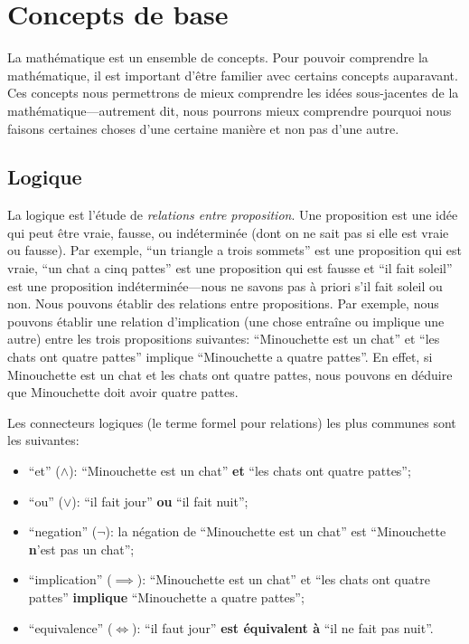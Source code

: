 \chapter{Concepts de base}

La mathématique est un ensemble de concepts. Pour pouvoir comprendre la mathématique, il est important d'être familier avec certains concepts auparavant. Ces concepts nous permettrons de mieux comprendre les idées sous-jacentes de la mathématique---autrement dit, nous pourrons mieux comprendre pourquoi nous faisons certaines choses d'une certaine manière et non pas d'une autre.

\section{Logique}

La logique est l'étude de {\em relations entre proposition}. Une proposition est une idée qui peut être vraie, fausse, ou indéterminée (dont on ne sait pas si elle est vraie ou fausse). Par exemple, ``un triangle a trois sommets'' est une proposition qui est vraie, ``un chat a cinq pattes'' est une proposition qui est fausse et ``il fait soleil'' est une proposition indéterminée---nous ne savons pas à priori s'il fait soleil ou non. Nous pouvons établir des relations entre propositions. Par exemple, nous pouvons établir une relation d'implication (une chose entraîne ou implique une autre) entre les trois propositions suivantes: ``Minouchette est un chat'' et ``les chats ont quatre pattes'' implique ``Minouchette a quatre pattes''. En effet, si Minouchette est un chat et les chats ont quatre pattes, nous pouvons en déduire que Minouchette doit avoir quatre pattes.

Les connecteurs logiques (le terme formel pour relations) les plus communes sont les suivantes:
\begin{itemize}
    \item ``et'' ($\wedge$): ``Minouchette est un chat'' \textbf{et} ``les chats ont quatre pattes'';
    \item ``ou'' ($\vee$): ``il fait jour'' \textbf{ou} ``il fait nuit'';
    \item ``negation'' ($\neg$): la négation de ``Minouchette est un chat'' est ``Minouchette \textbf{n}'est pas un chat'';
    \item ``implication'' ($\implies$): ``Minouchette est un chat'' et ``les chats ont quatre pattes'' \textbf{implique} ``Minouchette a quatre pattes'';
    \item ``equivalence'' ($\iff$): ``il faut jour'' \textbf{est équivalent à} ``il ne fait pas nuit''.
\end{itemize}


